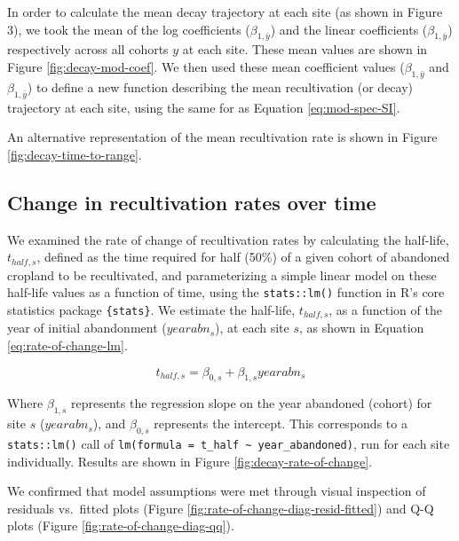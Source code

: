 \documentclass[9pt,lineno]{pnas-new}
\begin{document}
In order to calculate the mean decay trajectory at each site (as shown in Figure 3), we took the mean of the log coefficients (\(\beta_{1, \bar{y}}\)) and the linear coefficients (\(\beta_{1, \bar{y}}\)) respectively across all cohorts \(y\) at each site.
These mean values are shown in Figure \ref{fig:decay-mod-coef}.
We then used these mean coefficient values (\(\beta_{1, \bar{y}}\) and \(\beta_{1, \bar{y}}\)) to define a new function describing the mean recultivation (or decay) trajectory at each site, using the same for as Equation \eqref{eq:mod-spec-SI}.

An alternative representation of the mean recultivation rate is shown in Figure \ref{fig:decay-time-to-range}.

\hypertarget{section-methods-rate-of-change}{%
\subsection{Change in recultivation rates over time}\label{section-methods-rate-of-change}}

We examined the rate of change of recultivation rates by calculating the half-life, \(t_{half,s}\), defined as the time required for half (50\%) of a given cohort of abandoned cropland to be recultivated, and parameterizing a simple linear model on these half-life values as a function of time, using the \texttt{stats::lm()} function in R's core statistics package \texttt{\{stats\}}.
We estimate the half-life, \(t_{half,s}\), as a function of the year of initial abandonment (\(yearabn_{s}\)), at each site \(s\), as shown in Equation \eqref{eq:rate-of-change-lm}.

\begin{equation}
t_{half,s} = \beta_{0,s} + \beta_{1,s} yearabn_{s} \label{eq:rate-of-change-lm}
\end{equation}

Where \(\beta_{1,s}\) represents the regression slope on the year abandoned (cohort) for site \(s\) (\(yearabn_{s}\)), and \(\beta_{0,s}\) represents the intercept.
This corresponds to a \texttt{stats::lm()} call of \texttt{lm(formula\ =\ t\_half\ \textasciitilde{}\ year\_abandoned)}, run for each site individually.
Results are shown in Figure \ref{fig:decay-rate-of-change}.

We confirmed that model assumptions were met through visual inspection of residuals vs.~fitted plots (Figure \ref{fig:rate-of-change-diag-resid-fitted}) and Q-Q plots (Figure \ref{fig:rate-of-change-diag-qq}).
\end{document}
